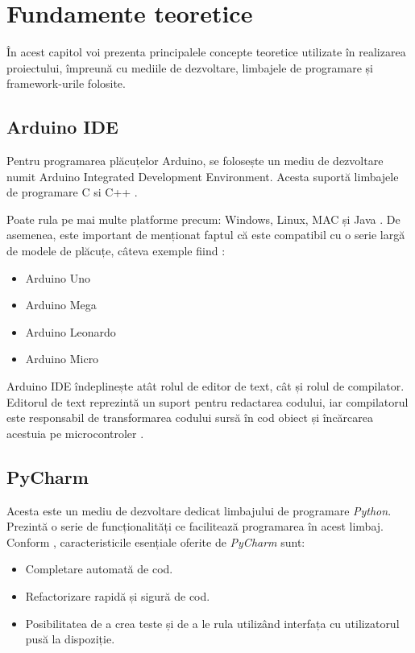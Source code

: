 \chapter{Fundamente teoretice}\label{ch:3fundamenteTeoretice}

	În acest capitol voi prezenta principalele concepte teoretice utilizate în realizarea proiectului, împreună cu mediile de dezvoltare, limbajele de programare și framework-urile folosite. 

\section{Arduino IDE}

	Pentru programarea plăcuțelor Arduino, se folosește un mediu de dezvoltare numit Arduino Integrated Development Environment. Acesta suportă limbajele de programare C si C++ \cite{arduinoIDE}. 

	Poate rula pe mai multe platforme precum: Windows, Linux, MAC și Java \cite{arduinoIDE}. De asemenea, este important de menționat faptul că este compatibil cu o serie largă de modele de plăcuțe, câteva exemple fiind \cite{arduinoIDE}:
		\begin{itemize}
			\setlength{\itemindent}{2em}
			\itemsep0em
			\item Arduino Uno
			\item Arduino Mega
			\item Arduino Leonardo
			\item Arduino Micro
		\end{itemize} 

	Arduino IDE îndeplinește atât rolul de editor de text, cât și rolul de compilator. Editorul de text reprezintă un suport pentru redactarea codului, iar compilatorul este responsabil de transformarea codului sursă în cod obiect și încărcarea acestuia pe microcontroler \cite{arduinoIDE}.

\section{PyCharm}

	Acesta este un mediu de dezvoltare dedicat limbajului de programare \textit{Python}. Prezintă o serie de funcționalități ce facilitează programarea în acest limbaj. Conform \cite{pyCharm}, caracteristicile esențiale oferite de \textit{PyCharm} sunt:
	\begin{itemize}
		\setlength{\itemindent}{2em}
		\itemsep0em
		\item Completare automată de cod.
		\item Refactorizare rapidă și sigură de cod.
		\item Posibilitatea de a crea teste și de a le rula utilizând interfața cu utilizatorul pusă la dispoziție. 
	\end{itemize}
	

